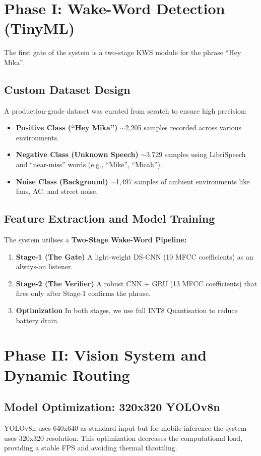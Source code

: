 \documentclass[12pt,a4paper]{report}
\begin{document}
 
 
\section{Phase I: Wake-Word Detection (TinyML)}
The first gate of the system is a two-stage KWS module for the phrase ``Hey Mika''.
 
\subsection{Custom Dataset Design}
A production-grade dataset was curated from scratch to ensure high precision:
\begin{itemize}[label=--]
    \item[1.] \textbf{Positive Class (``Hey Mika'')} $\sim$2,205 samples recorded across various environments.
    \item[2.] \textbf{Negative Class (Unknown Speech)} $\sim$3,729 samples using LibriSpeech and ``near-miss'' words (e.g., ``Mike'', ``Micah'').
    \item[3.] \textbf{Noise Class (Background)} $\sim$1,497 samples of ambient environments like fans, AC, and street noise.
\end{itemize}
 
\subsection{Feature Extraction and Model Training}
The system utilises a \textbf{Two-Stage Wake-Word Pipeline:}
\begin{enumerate}
    \item \textbf{Stage-1 (The Gate)} A light-weight DS-CNN (10 MFCC coefficients) as an always-on listener.
    \item \textbf{Stage-2 (The Verifier)} A robust CNN + GRU (13 MFCC coefficients) that fires only after Stage-1 confirms the phrase.
    \item \textbf{Optimization} In both stages, we use full INT8 Quantisation to reduce battery drain.
\end{enumerate}
 
\section{Phase II: Vision System and Dynamic Routing}
 
\subsection{Model Optimization: 320x320 YOLOv8n}
YOLOv8n uses 640x640 as standard input but for mobile inference the system uses 320x320 resolution. This optimization decreases the computational load, providing a stable FPS and avoiding thermal throttling.
 
\end{document}
